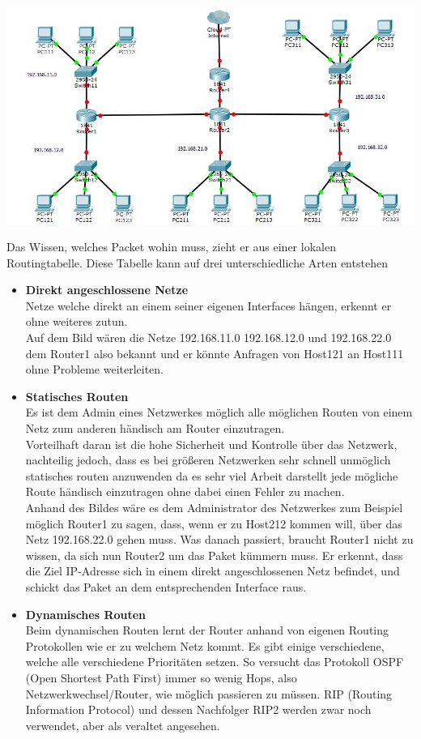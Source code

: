 \documentclass[11pt,a4paper]{report}
\begin{document}
\begin{center}
\includegraphics[scale=0.5]{../docs/tarkes/pics/RouterNetwork.jpg}\label{fig:bspNetwork}
\end{center}

Das Wissen, welches Packet wohin muss, zieht er aus einer lokalen Routingtabelle. Diese Tabelle kann auf drei unterschiedliche Arten entstehen\\
\begin{itemize}
\item \textbf{Direkt angeschlossene Netze}\\
Netze welche direkt an einem seiner eigenen Interfaces hängen, erkennt er ohne weiteres zutun.\\
Auf dem Bild wären die Netze 192.168.11.0 192.168.12.0 und 192.168.22.0 dem Router1 also bekannt und er könnte Anfragen von Host121 an Host111 ohne Probleme weiterleiten.
\item \textbf{Statisches Routen}\\
Es ist dem Admin eines Netzwerkes möglich alle möglichen Routen von einem Netz zum anderen händisch am Router einzutragen.\\
Vorteilhaft daran ist die hohe Sicherheit und Kontrolle über das Netzwerk, nachteilig jedoch, dass es bei größeren Netzwerken sehr schnell unmöglich statisches routen anzuwenden da es sehr viel Arbeit darstellt jede mögliche Route händisch einzutragen ohne dabei einen Fehler zu machen.\\
Anhand des Bildes wäre es dem Administrator des Netzwerkes zum Beispiel möglich Router1 zu sagen, dass, wenn er zu Host212 kommen will, über das Netz 192.168.22.0 gehen muss. Was danach passiert, braucht Router1 nicht zu wissen, da sich nun Router2 um das Paket kümmern muss. Er erkennt, dass die Ziel IP-Adresse sich in einem direkt angeschlossenen Netz befindet, und schickt das Paket an dem entsprechenden Interface raus.
\item \textbf{Dynamisches Routen}\\
Beim dynamischen Routen lernt der Router anhand von eigenen Routing Protokollen wie er zu welchem Netz kommt. Es gibt einige verschiedene, welche alle verschiedene Prioritäten setzen. So versucht das Protokoll OSPF (Open Shortest Path First) immer so wenig Hops, also Netzwerkwechsel/Router, wie möglich passieren zu müssen. RIP (Routing Information Protocol) und dessen Nachfolger RIP2 werden zwar noch verwendet, aber als veraltet angesehen.
\end{itemize}
\end{document}
